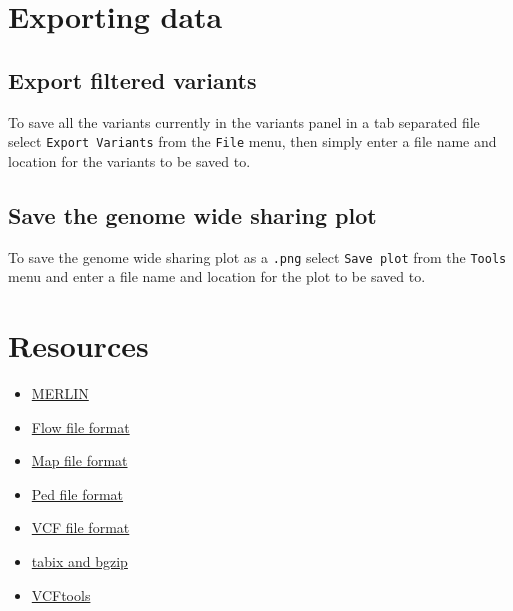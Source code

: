 \documentclass{article}
\begin{document}
\section{Exporting data}

\subsection{Export filtered variants}
To save all the variants currently in the variants panel in a tab separated file select \texttt{Export Variants} from the \texttt{File} menu, then simply enter a file name and location for the variants to be saved to.

\subsection{Save the genome wide sharing plot}
To save the genome wide sharing plot as a \texttt{.png} select \texttt{Save plot} from the \texttt{Tools} menu and enter a file name and location for the plot to be saved to.

\section{Resources}
\begin{itemize}
\item{\href{http://www.sph.umich.edu/csg/abecasis/Merlin/}{MERLIN}}
\item{\href{http://www.sph.umich.edu/csg/abecasis/Merlin/tour/haplotyping.html}{Flow file format}}
\item{\href{http://pngu.mgh.harvard.edu/~purcell/plink/data.shtml#map}{Map file format}}
\item{\href{http://pngu.mgh.harvard.edu/~purcell/plink/data.shtml#ped}{Ped file format}}
\item{\href{http://www.1000genomes.org/node/101}{VCF file format}}
\item{\href{http://sourceforge.net/projects/samtools/files/tabix/}{tabix and bgzip}}
\item{\href{http://vcftools.sourceforge.net/}{VCFtools}}
\end{itemize}
\end{document}
